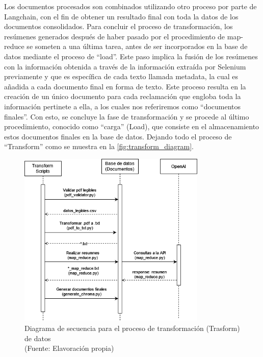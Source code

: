 \newpage

\par Los documentos procesados son combinados utilizando otro proceso por parte de Langchain, con el fin de obtener un resultado final con toda la datos de los documentos consolidados. 
Para concluir el proceso de transformación, los resúmenes generados después de haber pasado por el procedimiento de map-reduce 
se someten a una última tarea, antes de ser incorporados en la base de datos mediante el proceso de ``load''. Este paso implica la fusión de los resúmenes con la 
información obtenida a través de la información extraída por Selenium previamente y que es específica de cada texto llamada metadata, la cual es añadida a cada documento final en forma de texto. Este proceso 
resulta en la creación de un único documento para cada reclamación que engloba toda la información pertinete a ella, a los cuales nos referiremos como ``documentos finales''. 
Con esto, se concluye la fase de transformación y se procede al último procedimiento, conocido como ``carga'' (Load), que consiste 
en el almacenamiento estos documentos finales en la base de datos. Dejando todo el proceso de ``Transform'' como se muestra en la \autoref{fig:transform_diagram}. \\


\begin{figure}[ht!]
    \centering
    \includegraphics[width=0.8\textwidth]{figures/transfrom_diagram.png}
    \caption[Diagrama de secuencia para el proceso de transformación (Trasform) de datos]{Diagrama de secuencia para el proceso de transformación (Trasform) de datos\\
    {\scriptsize (Fuente: Elavoración propia)}}
    \label{fig:transform_diagram}
\end{figure}


